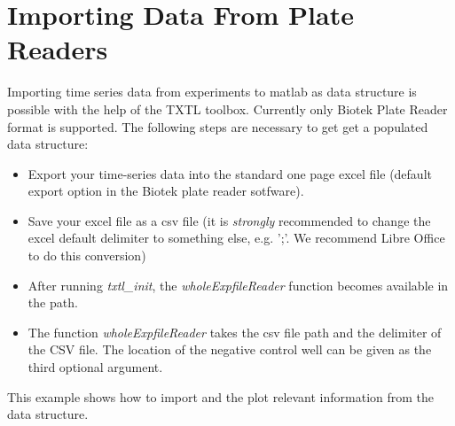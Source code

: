        \section{Importing Data From Plate Readers}
        Importing time series data from experiments to matlab as data structure is possible with the help of the TXTL toolbox. Currently only Biotek Plate Reader format is supported. The following steps are necessary to get get a populated data structure:
        \begin{itemize}
                \item Export your time-series data into the standard one page excel file (default export option in the Biotek plate reader sotfware).
                \item Save your excel file as a csv file (it is \textit{strongly} recommended to change the excel default delimiter to something else, e.g. ';'. We recommend Libre Office to do this conversion)
                \item After running \textit{txtl\_init}, the \textit{wholeExpfileReader} function becomes available in the path.
                \item The function \textit{wholeExpfileReader} takes the csv file path and the delimiter of the CSV file. The location of the negative control well can be given as the third optional argument.
        \end{itemize}
        This example shows how to import and the plot relevant information from the data structure.
        

